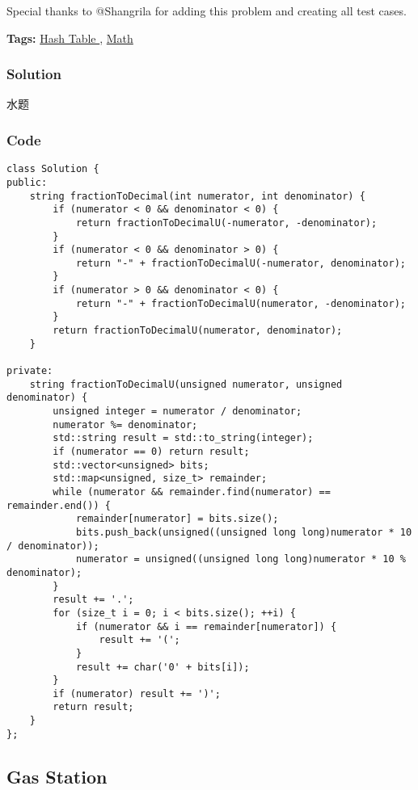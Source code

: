 \documentclass{article}
\begin{document}
\begin{CJK*}{UTF8}{gkai}
Special thanks to @Shangrila for adding this problem and creating all test cases.


\textbf{Tags: }
\hyperref[ Hash Table ]{ Hash Table },  \hyperref[ Math ]{ Math }



\subsubsection*{Solution}
水题

\subsubsection*{Code}
\begin{lstlisting}
class Solution {
public:
    string fractionToDecimal(int numerator, int denominator) {
        if (numerator < 0 && denominator < 0) {
            return fractionToDecimalU(-numerator, -denominator);
        }
        if (numerator < 0 && denominator > 0) {
            return "-" + fractionToDecimalU(-numerator, denominator);
        }
        if (numerator > 0 && denominator < 0) {
            return "-" + fractionToDecimalU(numerator, -denominator);
        }
        return fractionToDecimalU(numerator, denominator);
    }
    
private:
    string fractionToDecimalU(unsigned numerator, unsigned denominator) {
        unsigned integer = numerator / denominator;
        numerator %= denominator;
        std::string result = std::to_string(integer);
        if (numerator == 0) return result;
        std::vector<unsigned> bits;
        std::map<unsigned, size_t> remainder;
        while (numerator && remainder.find(numerator) == remainder.end()) {
            remainder[numerator] = bits.size();
            bits.push_back(unsigned((unsigned long long)numerator * 10 / denominator));
            numerator = unsigned((unsigned long long)numerator * 10 % denominator);
        }
        result += '.';
        for (size_t i = 0; i < bits.size(); ++i) {
            if (numerator && i == remainder[numerator]) {
                result += '(';
            }
            result += char('0' + bits[i]);
        }
        if (numerator) result += ')';
        return result;
    }
}; 
\end{lstlisting}


\subsection{ Gas Station }
\label{ Gas Station }


\end{CJK*}
\end{document}
